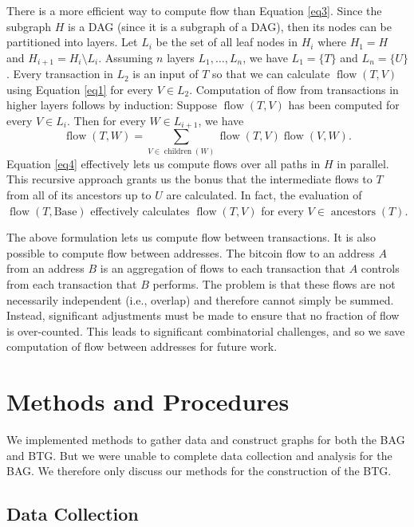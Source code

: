 \documentclass[letterpaper, 10 pt, conference]{ieeeconf}  %
\newcommand{\flow}{\operatorname{flow}}
\begin{document}
There is a more efficient way to compute flow than Equation \ref{eq3}. Since the subgraph $H$ is a DAG (since it is a subgraph of a DAG), then its nodes can be partitioned into layers. Let $L_i$ be the set of all leaf nodes in $H_i$ where $H_1 = H$ and $H_{i+1} = H_i\setminus L_i$. Assuming $n$ layers $L_1,\ldots,L_n$, we have $L_1=\{T\}$ and $L_n=\{U\}$. Every transaction in $L_2$ is an input of $T$ so that we can calculate $\flow(T, V)$ using Equation \ref{eq1} for every $V\in L_2$. Computation of flow from transactions in higher layers follows by induction: Suppose $\flow(T, V)$ has been computed for every $V\in L_i$. Then for every $W\in L_{i+1}$, we have
\begin{equation} \label{eq4}
\flow(T, W) = \sum_{V\in\operatorname{children}(W)} \flow(T, V)\flow(V, W).
\end{equation}
Equation \ref{eq4} effectively lets us compute flows over all paths in $H$ in parallel. This recursive approach grants us the bonus that the intermediate flows to $T$ from all of its ancestors up to $U$ are calculated. In fact, the evaluation of $\flow(T, \mbox{Base})$ effectively calculates $\flow(T, V)$ for every $V\in\operatorname{ancestors}(T)$.

The above formulation lets us compute flow between transactions. It is also possible to compute flow between addresses. The bitcoin flow to an address $A$ from an address $B$ is an aggregation of flows to each transaction that $A$ controls from each transaction that $B$ performs. The problem is that these flows are not necessarily independent (i.e., overlap) and therefore cannot simply be summed. Instead, significant adjustments must be made to ensure that no fraction of flow is over-counted. This leads to significant combinatorial challenges, and so we save computation of flow between addresses for future work.


\section{Methods and Procedures}

We implemented methods to gather data and construct graphs for both the BAG and BTG. But we were unable to complete data collection and analysis for the BAG. We therefore only discuss our methods for the construction of the BTG.

\subsection{Data Collection}
\end{document}
